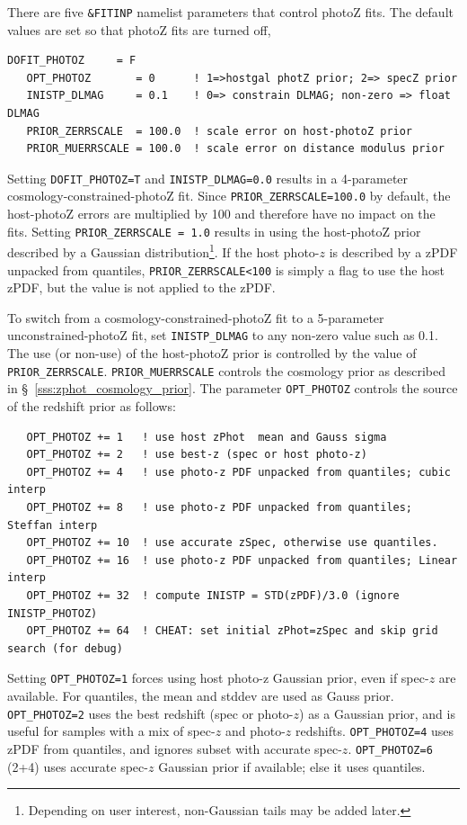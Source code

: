 \documentclass[12pt]{article}
\begin{document}
There are five {\tt \&FITINP} namelist parameters that
control photoZ fits. The default values are set so
that photoZ fits are turned off,
%
\begin{Verbatim}[frame=single]
   DOFIT_PHOTOZ     = F
   OPT_PHOTOZ       = 0      ! 1=>hostgal photZ prior; 2=> specZ prior
   INISTP_DLMAG     = 0.1    ! 0=> constrain DLMAG; non-zero => float DLMAG
   PRIOR_ZERRSCALE  = 100.0  ! scale error on host-photoZ prior
   PRIOR_MUERRSCALE = 100.0  ! scale error on distance modulus prior
\end{Verbatim}
%
Setting {\tt DOFIT\_PHOTOZ=T} and {\tt INISTP\_DLMAG=0.0}
results in a 4-parameter cosmology-constrained-photoZ fit.
Since {\tt PRIOR\_ZERRSCALE=100.0} by default, the host-photoZ
errors are multiplied by 100 and therefore have no impact on the fits.
Setting {\tt PRIOR\_ZERRSCALE = 1.0} results in using the 
host-photoZ prior described by a Gaussian 
distribution\footnote{Depending on user interest, 
non-Gaussian tails may be added later.}.
If the host photo-$z$ is described by a zPDF unpacked from quantiles,
{\tt PRIOR\_ZERRSCALE<100} is simply a flag to use the host zPDF,
but the value is not applied to the zPDF.

To switch from a cosmology-constrained-photoZ fit to a 5-parameter
unconstrained-photoZ fit, set {\tt INISTP\_DLMAG} to any
non-zero value such as 0.1. The use (or non-use) of the
host-photoZ prior is controlled by the value of 
{\tt PRIOR\_ZERRSCALE}. {\tt PRIOR\_MUERRSCALE} controls the
cosmology prior as described in  \S~\ref{sss:zphot_cosmology_prior}.
The parameter {\tt OPT\_PHOTOZ} controls the source of
the redshift prior as follows:
%
\begin{verbatim}
   OPT_PHOTOZ += 1   ! use host zPhot  mean and Gauss sigma
   OPT_PHOTOZ += 2   ! use best-z (spec or host photo-z) 
   OPT_PHOTOZ += 4   ! use photo-z PDF unpacked from quantiles; cubic interp
   OPT_PHOTOZ += 8   ! use photo-z PDF unpacked from quantiles; Steffan interp
   OPT_PHOTOZ += 10  ! use accurate zSpec, otherwise use quantiles.
   OPT_PHOTOZ += 16  ! use photo-z PDF unpacked from quantiles; Linear interp 
   OPT_PHOTOZ += 32  ! compute INISTP = STD(zPDF)/3.0 (ignore INISTP_PHOTOZ)
   OPT_PHOTOZ += 64  ! CHEAT: set initial zPhot=zSpec and skip grid search (for debug)
\end{verbatim}
%
Setting {\tt OPT\_PHOTOZ=1} forces using host photo-z Gaussian prior, 
even if spec-$z$ are available. For quantiles, the mean and stddev are used as Gauss prior.
{\tt OPT\_PHOTOZ=2} uses the best redshift (spec or photo-$z$)
as a Gaussian prior, and is useful for samples with a mix of spec-$z$ and 
photo-$z$ redshifts.
%
{\tt OPT\_PHOTOZ=4} uses zPDF from quantiles, and ignores 
subset with accurate spec-$z$.
{\tt OPT\_PHOTOZ=6} (2+4) uses accurate spec-$z$ Gaussian prior
if available; else it uses quantiles.
\end{document}
